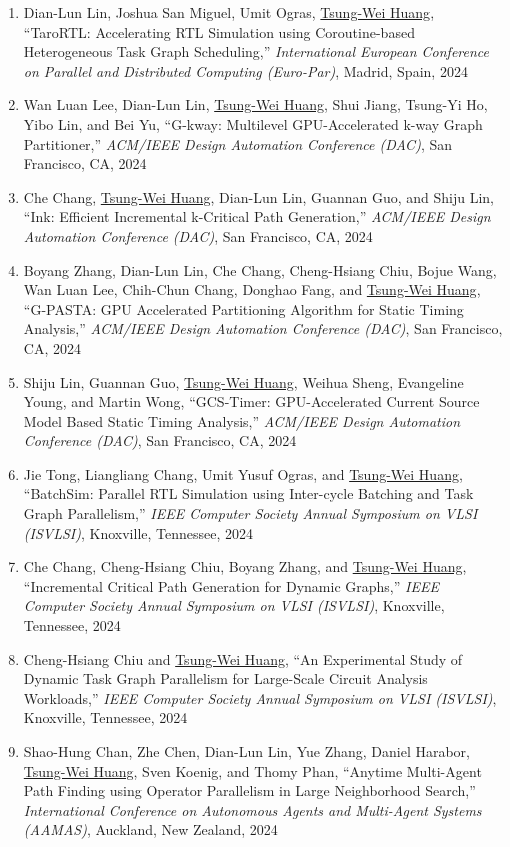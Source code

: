 \documentclass[A4,11pt]{article}
\begin{document}
\begin{enumerate}
    \item Dian-Lun Lin, Joshua San Miguel, Umit Ogras, \underline{Tsung-Wei Huang}, ``TaroRTL: Accelerating RTL Simulation using Coroutine-based Heterogeneous Task Graph Scheduling,'' \textit{International European Conference on Parallel and Distributed Computing (Euro-Par)}, Madrid, Spain, 2024
    \item Wan Luan Lee, Dian-Lun Lin, \underline{Tsung-Wei Huang}, Shui Jiang, Tsung-Yi Ho, Yibo Lin, and Bei Yu, ``G-kway: Multilevel GPU-Accelerated k-way Graph Partitioner,'' \textit{ACM/IEEE Design Automation Conference (DAC)}, San Francisco, CA, 2024
    \item Che Chang, \underline{Tsung-Wei Huang}, Dian-Lun Lin, Guannan Guo, and Shiju Lin, ``Ink: Efficient Incremental k-Critical Path Generation,'' \textit{ACM/IEEE Design Automation Conference (DAC)}, San Francisco, CA, 2024
    \item Boyang Zhang, Dian-Lun Lin, Che Chang, Cheng-Hsiang Chiu, Bojue Wang, Wan Luan Lee, Chih-Chun Chang, Donghao Fang, and \underline{Tsung-Wei Huang}, ``G-PASTA: GPU Accelerated Partitioning Algorithm for Static Timing Analysis,'' \textit{ACM/IEEE Design Automation Conference (DAC)}, San Francisco, CA, 2024
    \item Shiju Lin, Guannan Guo, \underline{Tsung-Wei Huang}, Weihua Sheng, Evangeline Young, and Martin Wong, ``GCS-Timer: GPU-Accelerated Current Source Model Based Static Timing Analysis,'' \textit{ACM/IEEE Design Automation Conference (DAC)}, San Francisco, CA, 2024
    \item Jie Tong, Liangliang Chang, Umit Yusuf Ogras, and \underline{Tsung-Wei Huang}, ``BatchSim: Parallel RTL Simulation using Inter-cycle Batching and Task Graph Parallelism,'' \textit{IEEE Computer Society Annual Symposium on VLSI (ISVLSI)}, Knoxville, Tennessee, 2024
    \item Che Chang, Cheng-Hsiang Chiu, Boyang Zhang, and \underline{Tsung-Wei Huang}, ``Incremental Critical Path Generation for Dynamic Graphs,'' \textit{IEEE Computer Society Annual Symposium on VLSI (ISVLSI)}, Knoxville, Tennessee, 2024
    \item Cheng-Hsiang Chiu and \underline{Tsung-Wei Huang}, ``An Experimental Study of Dynamic Task Graph Parallelism for Large-Scale Circuit Analysis Workloads,'' \textit{IEEE Computer Society Annual Symposium on VLSI (ISVLSI)}, Knoxville, Tennessee, 2024
    \item Shao-Hung Chan, Zhe Chen, Dian-Lun Lin, Yue Zhang, Daniel Harabor, \underline{Tsung-Wei Huang}, Sven Koenig, and Thomy Phan, ``Anytime Multi-Agent Path Finding using Operator Parallelism in Large Neighborhood Search,'' \textit{International Conference on Autonomous Agents and Multi-Agent Systems (AAMAS)}, Auckland, New Zealand, 2024

\end{enumerate}
\end{document}
